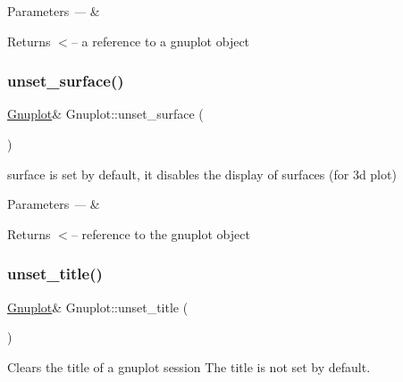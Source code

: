 \begin{DoxyParams}{Parameters}
{\em ---} & \\
\hline
\end{DoxyParams}
\begin{DoxyReturn}{Returns}
$<$-- a reference to a gnuplot object 
\end{DoxyReturn}
\mbox{\label{class_gnuplot_a4ebddacbec61aa3e7bc4b89f508ad621}} 
\subsubsection{\texorpdfstring{unset\+\_\+surface()}{unset\_surface()}}
{\footnotesize\ttfamily \mbox{\hyperlink{class_gnuplot}{Gnuplot}}\& Gnuplot\+::unset\+\_\+surface (\begin{DoxyParamCaption}{ }\end{DoxyParamCaption})\hspace{0.3cm}{\ttfamily [inline]}}

surface is set by default, it disables the display of surfaces (for 3d plot)


\begin{DoxyParams}{Parameters}
{\em ---} & \\
\hline
\end{DoxyParams}
\begin{DoxyReturn}{Returns}
$<$-- reference to the gnuplot object 
\end{DoxyReturn}
\mbox{\label{class_gnuplot_aca0aeb1dc0ac8d7e68ba6a15a977be28}} 
\subsubsection{\texorpdfstring{unset\+\_\+title()}{unset\_title()}}
{\footnotesize\ttfamily \mbox{\hyperlink{class_gnuplot}{Gnuplot}}\& Gnuplot\+::unset\+\_\+title (\begin{DoxyParamCaption}{ }\end{DoxyParamCaption})\hspace{0.3cm}{\ttfamily [inline]}}



Clears the title of a gnuplot session The title is not set by default. 


